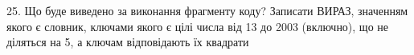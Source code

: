 \documentclass[11pt]{article}
\begin{document}
25. Що буде виведено за виконання фрагменту коду?
Записати ВИРАЗ, значенням якого є словник, ключами якого є цілі числа від 13 до 2003 (включно), що не діляться на 5, а ключам відповідають їх квадрати 


























\newpage
\end{document}
